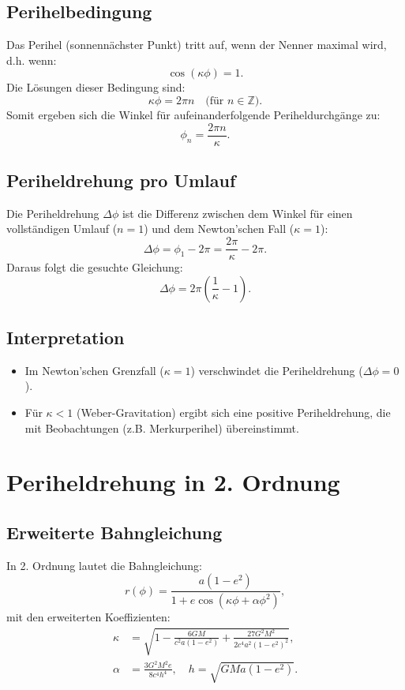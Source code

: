 \subsection{Perihelbedingung}
Das Perihel (sonnennächster Punkt) tritt auf, wenn der Nenner maximal wird, d.h. wenn:
\begin{equation}
\cos(\kappa\phi) = 1.
\end{equation}
Die Lösungen dieser Bedingung sind:
\begin{equation}
\kappa\phi = 2\pi n \quad \text{(für $n \in \mathbb{Z}$)}.
\end{equation}
Somit ergeben sich die Winkel für aufeinanderfolgende Periheldurchgänge zu:
\begin{equation}
\phi_n = \frac{2\pi n}{\kappa}.
\end{equation}

\subsection{Periheldrehung pro Umlauf}
Die Periheldrehung $\Delta\phi$ ist die Differenz zwischen dem Winkel für einen vollständigen Umlauf ($n = 1$) und dem Newton'schen Fall ($\kappa = 1$):
\begin{equation}
\Delta\phi = \phi_1 - 2\pi = \frac{2\pi}{\kappa} - 2\pi.
\end{equation}
Daraus folgt die gesuchte Gleichung:
\begin{equation}
\boxed{\Delta\phi = 2\pi\left(\frac{1}{\kappa} - 1\right)}.
\end{equation}

\subsection{Interpretation}
\begin{itemize}
\item Im Newton'schen Grenzfall ($\kappa = 1$) verschwindet die Periheldrehung ($\Delta\phi = 0$).
\item Für $\kappa < 1$ (Weber-Gravitation) ergibt sich eine positive Periheldrehung, die mit Beobachtungen (z.B. Merkurperihel) übereinstimmt.
\end{itemize}

\section{Periheldrehung in 2. Ordnung}

\subsection{Erweiterte Bahngleichung}
In 2. Ordnung lautet die Bahngleichung:
\begin{equation}
r(\phi) = \frac{a(1 - e^2)}{1 + e \cos\left(\kappa\phi + \alpha\phi^2\right)},
\end{equation}
mit den erweiterten Koeffizienten:
\begin{align}
\kappa &= \sqrt{1 - \frac{6GM}{c^2 a(1 - e^2)} + \frac{27G^2 M^2}{2c^4 a^2 (1 - e^2)^2}}, \\
\alpha &= \frac{3G^2 M^2 e}{8c^4 h^4}, \quad h = \sqrt{GMa(1 - e^2)}.
\end{align}

